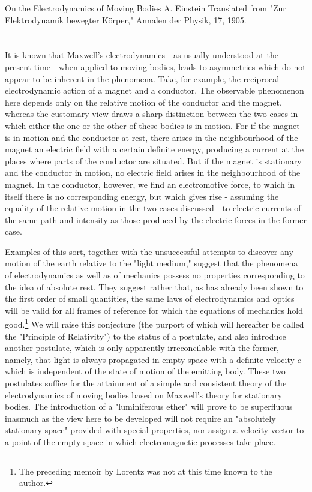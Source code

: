 \paperheader
	{On the Electrodynamics of Moving Bodies}
	{A. Einstein}
	{Translated from "Zur Elektrodynamik bewegter Körper," Annalen der Physik, 17, 1905.}


\section*{}
It is known that Maxwell's electrodynamics - as usually understood at the present time - when applied to moving bodies, leads to asymmetries which do not appear to be inherent in the phenomena. Take, for example, the reciprocal electrodynamic action of a magnet and a conductor. The observable phenomenon here depends only on the relative motion of the conductor and the magnet, whereas the customary view draws a sharp distinction between the two cases in which either the one or the other of these bodies is in motion. For if the magnet is in motion and the conductor at rest, there arises in the neighbourhood of the magnet an electric field with a certain definite energy, producing a current at the places where parts of the conductor are situated. But if the magnet is stationary and the conductor in motion, no electric field arises in the neighbourhood of the magnet. In the conductor, however, we find an electromotive force, to which in itself there is no corresponding energy, but which gives rise - assuming the equality of the relative motion in  the two cases discussed - to electric currents of the same path and intensity as those produced by the electric forces in the former case.

Examples of this sort, together with the unsuccessful attempts to discover any motion of the earth relative to the "light medium," suggest that the phenomena of electrodynamics as well as of mechanics possess no properties corresponding to the idea of absolute rest. They suggest rather that, as has already been shown to the first order of small quantities, the same laws of electrodynamics and optics will be valid for all frames of reference for which the equations of mechanics hold good.\footnote{The preceding memoir by Lorentz was not at this time known to the author.} We will raise this conjecture (the purport of which will hereafter be called the "Principle of Relativity") to the status of a postulate, and also introduce another postulate, which is only apparently irreconcilable with the former, namely, that light is always propagated in empty space with a definite velocity $c$ which is independent of the state of motion of the emitting body. These two postulates suffice for the attainment of a simple and consistent theory of the electrodynamics of moving bodies based on Maxwell's theory for stationary bodies. The introduction of a "luminiferous ether" will prove to be superfluous inasmuch as the view here to be developed will not require an "absolutely stationary space" provided with special properties, nor assign a velocity-vector to a point of the empty space in which electromagnetic processes take place.

